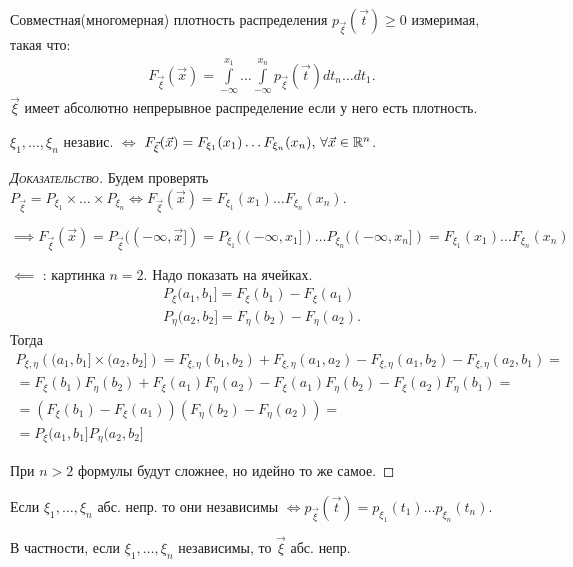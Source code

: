 \begin{df}
 Совместная(многомерная) плотность распределения $ p_{\vec\xi}(\vec t) \geqslant 0 $  измеримая, такая что:
 \begin{align*}
  F_{\vec\xi}(\vec x) = \int\limits_{-\infty}^{x_1}  \ldots \int\limits_{-\infty}^{x_n} p_{\vec\xi}(\vec t) dt_n \ldots dt_1.
 \end{align*} 
 $\vec \xi$ имеет абсолютно непрерывное распределение если у него есть плотность.
\end{df}
\begin{crly}
	$ \xi_1, \ldots, \xi_n $ независ. $ \iff $ $ F_{\vec\xi}(\vec x) = F_{\xi_1}(x_1) \ldots F_{\xi_n}(x_n), \, \forall \vec x \in \mathbb{R}^n $.
\end{crly}
\begin{proof}[\normalfont\textsc{Доказательство}]
 Будем проверять $ P_{\vec\xi} = P_{\xi_1} \times \ldots \times P_{\xi_n} \iff F_{\vec\xi}(\vec x) = F_{\xi_1}(x_1) \ldots F_{\xi_n}(x_n) $.

$\implies F_{\vec \xi}(\vec x) = P_{\vec \xi}((-\infty, \vec x]) = P_{\xi_1}((-\infty, x_1]) \dots P_{\xi_n}((-\infty, x_n]) = F_{\xi_1}(x_1) \dots F_{\xi_n}(x_n)$ 

 $ \impliedby $ : картинка $ n=2 $. Надо показать на ячейках. 
 \begin{align*}
  P_{\xi} (a_1,b_1] = F_{\xi}(b_1) - F_{\xi}(a_1) \\
  P_{\eta} (a_2,b_2] = F_{\eta}(b_2) - F_{\eta}(a_2).
 \end{align*} Тогда
 \begin{align*}
	 P_{\xi, \eta} \left( (a_1, b_1] \times (a_2, b_2] \right) 
	 = F_{\xi, \eta} (b_1, b_2) + F_{\xi, \eta} (a_1, a_2) - F_{\xi, \eta} (a_1, b_2) - F_{\xi, \eta}(a_2, b_1) = \\ 
	 = F_{\xi} (b_1) F_{\eta} (b_2) + F_{\xi}(a_1) F_{\eta} (a_2) - F_{\xi}(a_1) F_{\eta} (b_2) - F_{\xi} (a_2) F_{\eta} (b_1) = \\
	 = \left(F_{\xi} (b_1) - F_{\xi} (a_1) \right) \left( F_{\eta} (b_2) - F_{\eta} (a_2) \right) = \\
	 = P_\xi (a_1, b_1] P_\eta (a_2, b_2]
 \end{align*}

 При $n > 2$ формулы будут сложнее, но идейно то же самое.

\end{proof}
\begin{crly}
 Если $ \xi_1, \ldots, \xi_n $ абс. непр. то они независимы $ \iff p_{\vec\xi}(\vec t) = p_{\xi_1}(t_1) \ldots p_{\xi_n}(t_n) $.

 В частности, если $ \xi_1, \ldots, \xi_n $ независимы, то $ \vec\xi $ абс. непр.
\end{crly}
